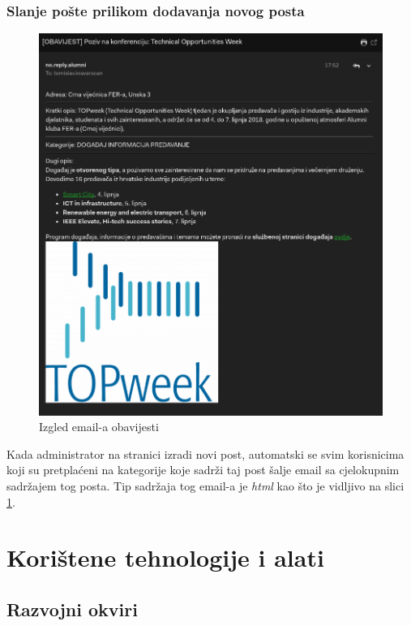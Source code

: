 \documentclass[zavrsni, numeric]{fer}
\begin{document}
\subsection{Slanje pošte prilikom dodavanja novog posta}

\begin{figure}[H]
	\centering
	\includegraphics[width=13cm]{slike/mail.png}
	\caption{Izgled email-a obavijesti} 
	\label{fig:mail}
\end{figure}

Kada administrator na stranici izradi novi post, automatski se svim korisnicima koji su pretplaćeni na kategorije koje sadrži taj post šalje email sa cjelokupnim sadržajem tog posta. Tip sadržaja tog email-a je \textit{html} kao što je vidljivo na slici \ref{fig:mail}. 

\chapter{Korištene tehnologije i alati}

\section{Razvojni okviri}
\end{document}

